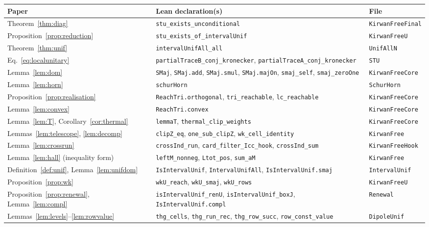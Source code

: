 \documentclass[11pt]{amsart}
\theoremstyle{definition}
\theoremstyle{remark}
\numberwithin{equation}{section}
\newcommand{\lean}[1]{\texttt{#1}}
\begin{document}
\begin{table}[ht]
\centering\small
\begin{tabular}{p{}p{}p{}}
\toprule
Paper & Lean declaration(s) & File\\
\midrule
Theorem~\ref{thm:diag} & \lean{stu\_exists\_unconditional} & \lean{KirwanFreeFinal}\\
Proposition~\ref{prop:reduction} & \lean{stu\_exists\_of\_intervalUnif} & \lean{KirwanFreeU}\\
Theorem~\ref{thm:unif} & \lean{intervalUnifAll\_all} & \lean{UnifAllN}\\
Eq.~\eqref{eq:localunitary} & \lean{partialTraceB\_conj\_kronecker}, \lean{partialTraceA\_conj\_kronecker} & \lean{STU}\\
Lemma~\ref{lem:dom} & \lean{SMaj}, \lean{SMaj.add}, \lean{SMaj.smul}, \lean{SMaj.majOn}, \lean{smaj\_self}, \lean{smaj\_zeroOne} & \lean{KirwanFreeCore}\\
Lemma~\ref{lem:horn} & \lean{schurHorn} & \lean{SchurHorn}\\
Proposition~\ref{prop:realisation} & \lean{ReachTri.orthogonal}, \lean{tri\_reachable}, \lean{lc\_reachable} & \lean{KirwanFreeCore}\\
Lemma~\ref{lem:convex} & \lean{ReachTri.convex} & \lean{KirwanFreeCore}\\
Lemma~\ref{lem:T}, Corollary~\ref{cor:thermal} & \lean{lemmaT}, \lean{thermal\_clip\_weights} & \lean{KirwanFreeCore}\\
Lemmas~\ref{lem:telescope}, \ref{lem:decomp} & \lean{clipZ\_eq}, \lean{one\_sub\_clipZ}, \lean{wk\_cell\_identity} & \lean{KirwanFree}\\
Lemma~\ref{lem:crossrun} & \lean{crossInd\_run}, \lean{card\_filter\_Icc\_hook}, \lean{crossInd\_sum} & \lean{KirwanFreeHook}\\
Lemma~\ref{lem:hall} (inequality form) & \lean{leftM\_nonneg}, \lean{Ltot\_pos}, \lean{sum\_aM} & \lean{KirwanFree}\\
Definition~\ref{def:unif}, Lemma~\ref{lem:unifdom} & \lean{IsIntervalUnif}, \lean{IntervalUnifAll}, \lean{IsIntervalUnif.smaj} & \lean{IntervalUnif}\\
Proposition~\ref{prop:wk} & \lean{wkU\_reach}, \lean{wkU\_smaj}, \lean{wkU\_rows} & \lean{KirwanFreeU}\\
Proposition~\ref{prop:renewal}, Lemma~\ref{lem:compl} & \lean{isIntervalUnif\_renU}, \lean{isIntervalUnif\_boxJ}, \lean{IsIntervalUnif.compl} & \lean{Renewal}\\
Lemmas~\ref{lem:levels}--\ref{lem:rowvalue} & \lean{thg\_cells}, \lean{thg\_run\_rec}, \lean{thg\_row\_succ}, \lean{row\_const\_value} & \lean{DipoleUnif}\\

\end{tabular}
\end{table}
\end{document}
